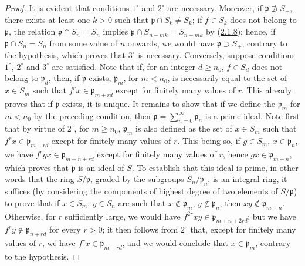 \begin{proof}
It is evident that conditions $1^\circ$ and $2^\circ$ are necessary.
Moreover, if $\mathfrak{p}\not\supset S_+$, there exists at least one $k>0$
such that $\mathfrak{p}\cap S_k\neq S_k$; if $f\in S_k$ does not belong to
$\mathfrak{p}$, the relation $\mathfrak{p}\cap S_n=S_n$ implies
$\mathfrak{p}\cap S_{n-mk}=S_{n-mk}$ by
(\hyperref[II.2.1.8]{2.1.8}); hence, if
$\mathfrak{p}\cap S_n=S_n$ from some value of $n$ onwards, we would have
$\mathfrak{p}\supset S_+$, contrary to the hypothesis, which proves that
$3^\circ$ is necessary. Conversely, suppose conditions
$1^\circ$, $2^\circ$ and $3^\circ$ are satisfied. Note that if, for an
integer $d\geq n_0$, $f\in S_d$ does not belong to $\mathfrak{p}_d$, then,
if $\mathfrak{p}$ exists, $\mathfrak{p}_m$, for $m<n_0$, is necessarily
equal to the set of $x\in S_m$ such that
$f^rx\in\mathfrak{p}_{m+rd}$ except for finitely many values of $r$.
This already proves that if $\mathfrak{p}$ exists, it is unique. It remains
to show that if we define the $\mathfrak{p}_m$ for $m<n_0$ by the preceding
condition, then $\mathfrak{p}=\sum_{n=0}^{\infty}\mathfrak{p}_n$ is a prime
ideal. Note first that by virtue of $2^\circ$, for $m\geq n_0$,
$\mathfrak{p}_m$ is also defined as the set of $x\in S_m$ such that
$f^rx\in\mathfrak{p}_{m+rd}$ except for finitely many values of $r$.
This
being so, if $g\in S_m$, $x\in\mathfrak{p}_n$, we have
$f^rgx\in\mathfrak{p}_{m+n+rd}$ except for finitely many values of $r$,
hence $gx\in\mathfrak{p}_{m+n}$, which proves that $\mathfrak{p}$ is an
ideal of $S$. To establish that this ideal is prime, in other words that
the ring $S/\mathfrak{p}$, graded by the subgroups
$S_n/\mathfrak{p}_n$, is an integral ring, it suffices (by considering the
components of highest degree of two elements of $S/\mathfrak{p}$) to
prove that if $x\in S_m$, $y\in S_n$ are such that
$x\notin\mathfrak{p}_m$, $y\notin\mathfrak{p}_n$, then
$xy\notin\mathfrak{p}_{m+n}$. Otherwise, for $r$ sufficiently large, we would
have $f^{2r}xy\in\mathfrak{p}_{m+n+2rd}$; but we have
$f^ry\notin\mathfrak{p}_{n+rd}$ for every $r>0$; it then follows from
$2^\circ$ that, except for finitely many values of $r$, we have
$f^rx\in\mathfrak{p}_{m+rd}$, and we would conclude that
$x\in\mathfrak{p}_m$, contrary to the hypothesis.
\end{proof}

